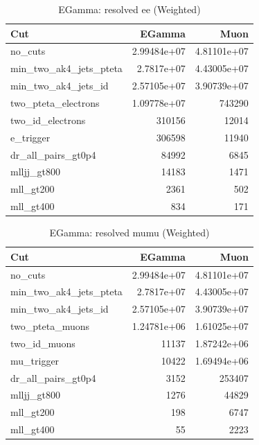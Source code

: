 \documentclass{article}
\begin{document}
\begin{table}[htbp]
\centering
\caption{EGamma: resolved ee (Weighted)}
\begin{tabular}{lrr}
\hline
Cut & EGamma & Muon \\
\hline
no\_cuts & 2.99484e+07 & 4.81101e+07 \\
min\_two\_ak4\_jets\_pteta & 2.7817e+07 & 4.43005e+07 \\
min\_two\_ak4\_jets\_id & 2.57105e+07 & 3.90739e+07 \\
two\_pteta\_electrons & 1.09778e+07 & 743290 \\
two\_id\_electrons & 310156 & 12014 \\
e\_trigger & 306598 & 11940 \\
dr\_all\_pairs\_gt0p4 & 84992 & 6845 \\
mlljj\_gt800 & 14183 & 1471 \\
mll\_gt200 & 2361 & 502 \\
mll\_gt400 & 834 & 171 \\
\hline
\end{tabular}
\end{table}

\begin{table}[htbp]
\centering
\caption{EGamma: resolved mumu (Weighted)}
\begin{tabular}{lrr}
\hline
Cut & EGamma & Muon \\
\hline
no\_cuts & 2.99484e+07 & 4.81101e+07 \\
min\_two\_ak4\_jets\_pteta & 2.7817e+07 & 4.43005e+07 \\
min\_two\_ak4\_jets\_id & 2.57105e+07 & 3.90739e+07 \\
two\_pteta\_muons & 1.24781e+06 & 1.61025e+07 \\
two\_id\_muons & 11137 & 1.87242e+06 \\
mu\_trigger & 10422 & 1.69494e+06 \\
dr\_all\_pairs\_gt0p4 & 3152 & 253407 \\
mlljj\_gt800 & 1276 & 44829 \\
mll\_gt200 & 198 & 6747 \\
mll\_gt400 & 55 & 2223 \\
\hline
\end{tabular}
\end{table}
\end{document}
